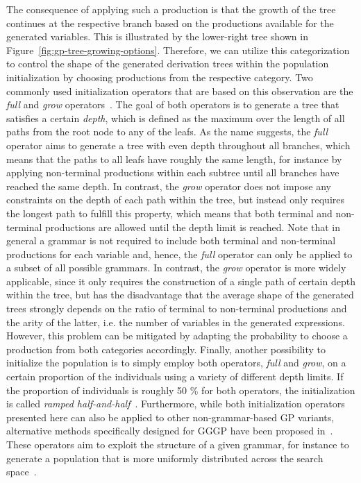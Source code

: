 The consequence of applying such a production is that the growth of the tree continues at the respective branch based on the productions available for the generated variables.
This is illustrated by the lower-right tree shown in Figure~\ref{fig:gp-tree-growing-options}. 
Therefore, we can utilize this categorization to control the shape of the generated derivation trees within the population initialization by choosing productions from the respective category.
Two commonly used initialization operators that are based on this observation are the \emph{full} and \emph{grow} operators~\cite{poli2008field}.  
The goal of both operators is to generate a tree that satisfies a certain \emph{depth}, which is defined as the maximum over the length of all paths from the root node to any of the leafs.
As the name suggests, the \emph{full} operator aims to generate a tree with even depth throughout all branches, which means that the paths to all leafs have roughly the same length, for instance by applying non-terminal productions within each subtree until all branches have reached the same depth.
In contrast, the \emph{grow} operator does not impose any constraints on the depth of each path within the tree, but instead only requires the longest path to fulfill this property, which means that both terminal and non-terminal productions are allowed until the depth limit is reached.
Note that in general a grammar is not required to include both terminal and non-terminal productions for each variable and, hence, the \emph{full} operator can only be applied to a subset of all possible grammars.
In contrast, the \emph{grow} operator is more widely applicable, since it only requires the construction of a single path of certain depth within the tree, but has the disadvantage that the average shape of the generated trees strongly depends on the ratio of terminal to non-terminal productions and the arity of the latter, i.e. the number of variables in the generated expressions.
However, this problem can be mitigated by adapting the probability to choose a production from both categories accordingly. 
Finally, another possibility to initialize the population is to simply employ both operators, \emph{full} and \emph{grow}, on a certain proportion of the individuals using a variety of different depth limits. 
If the proportion of individuals is roughly 50 \% for both operators, the initialization is called \emph{ramped half-and-half}~\cite{poli2008field,koza1994genetic}.
Furthermore, while both initialization operators presented here can also be applied to other non-grammar-based GP variants, alternative methods specifically designed for GGGP have been proposed in~\cite{garcia2006initialization,criado2020grammatically}.
These operators aim to exploit the structure of a given grammar, for instance to generate a population that is more uniformly distributed across the search space~\cite{criado2020grammatically}.
